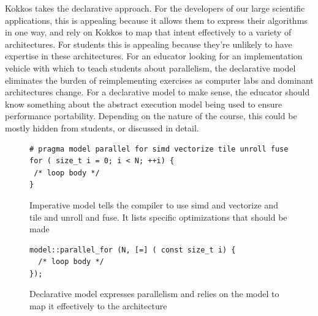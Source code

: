 Kokkos takes the declarative approach. For the developers of our large scientific applications, this is appealing because it allows them to express their algorithms in one way, and rely on Kokkos to map that intent effectively to a variety of architectures. For students this is appealing because they're unlikely to have expertise in these architectures. For an educator looking for an implementation vehicle with which to teach students about parallelism, the declarative model eliminates the burden of reimplementing exercises as computer labs and dominant architectures change. For a declarative model to make sense, the educator should know something about the abstract execution model being used to ensure performance portability. Depending on the nature of the course, this could be mostly hidden from students, or discussed in detail.

\begin{figure}
\begin{Verbatim}[frame=leftline]
# pragma model parallel for simd vectorize tile unroll fuse
for ( size_t i = 0; i < N; ++i) {
 /* loop body */
}
\end{Verbatim}
\caption{Imperative model tells the compiler to use simd and vectorize and tile and unroll and fuse. It lists specific optimizations that should be made}
\label{figOMPLike}
\end{figure}

\begin{figure}
\begin{Verbatim}[frame=leftline]
model::parallel_for (N, [=] ( const size_t i) {
  /* loop body */
});
\end{Verbatim}
\caption{Declarative model expresses parallelism and relies on the model to map it effectively to the architecture}
\label{figKokkosLike}
\end{figure}
